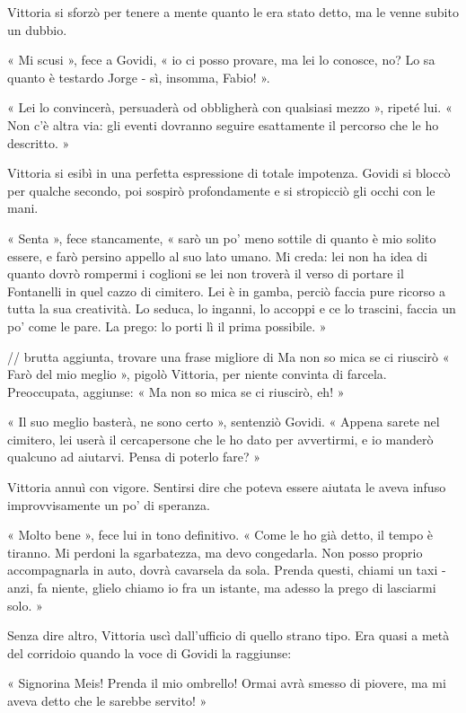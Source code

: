 Vittoria si sforzò per tenere a mente quanto le era stato detto, ma le venne subito un dubbio.

« Mi scusi », fece a Govidi, « io ci posso provare, ma lei lo conosce, no? Lo sa quanto è testardo Jorge - sì, insomma, Fabio! ».

« Lei lo convincerà, persuaderà od obbligherà con qualsiasi mezzo », ripeté lui. « Non c'è altra via: gli eventi dovranno seguire esattamente il percorso che le ho descritto. »

Vittoria si esibì in una perfetta espressione di totale impotenza. Govidi si bloccò per qualche secondo, poi sospirò profondamente e si stropicciò gli occhi con le mani.

« Senta », fece stancamente, « sarò un po' meno sottile di quanto è mio solito essere, e farò persino appello al suo lato umano. Mi creda: lei non ha idea di quanto dovrò rompermi i coglioni se lei non troverà il verso di portare il Fontanelli in quel cazzo di cimitero. Lei è in gamba, perciò faccia pure ricorso a tutta la sua creatività. Lo seduca, lo inganni, lo accoppi e ce lo trascini, faccia un po' come le pare. La prego: lo porti lì il prima possibile. »

// brutta aggiunta, trovare una frase migliore di Ma non so mica se ci riuscirò
« Farò del mio meglio », pigolò Vittoria, per niente convinta di farcela. Preoccupata, aggiunse: « Ma non so mica se ci riuscirò, eh! »

« Il suo meglio basterà, ne sono certo », sentenziò Govidi. « Appena sarete nel cimitero, lei userà il cercapersone che le ho dato per avvertirmi, e io manderò qualcuno ad aiutarvi. Pensa di poterlo fare? »

Vittoria annuì con vigore. Sentirsi dire che poteva essere aiutata le aveva infuso improvvisamente un po' di speranza.

« Molto bene », fece lui in tono definitivo. « Come le ho già detto, il tempo è tiranno. Mi perdoni la sgarbatezza, ma devo congedarla. Non posso proprio accompagnarla in auto, dovrà cavarsela da sola. Prenda questi, chiami un taxi - anzi, fa niente, glielo chiamo io fra un istante, ma adesso la prego di lasciarmi solo. »

Senza dire altro, Vittoria uscì dall'ufficio di quello strano tipo. Era quasi a metà del corridoio quando la voce di Govidi la raggiunse:

« Signorina Meis! Prenda il mio ombrello! Ormai avrà smesso di piovere, ma mi aveva detto che le sarebbe servito! »